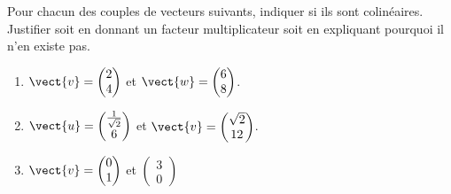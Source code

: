 
\begin{exercice}\label{exosmath-0299}

    Pour chacun des couples de vecteurs suivants, indiquer si ils sont colinéaires. Justifier soit en donnant un facteur multiplicateur soit en expliquant pourquoi il n'en existe pas.
    \begin{multicols}{2}
        \begin{enumerate}
            \item
                \( \vect{ v }=\begin{pmatrix}
                    2    \\ 
                    4    
                \end{pmatrix}\) et \( \vect{ w }=\begin{pmatrix}
                    6    \\ 
                    8    
                \end{pmatrix}\). 
            \item
                \( \vect{ u }=\begin{pmatrix}
                    \frac{1}{ \sqrt{2} }    \\ 
                    6    
                \end{pmatrix}\) et \( \vect{ v }=\begin{pmatrix}
                    \sqrt{2}    \\ 
                    12    
                \end{pmatrix}\).
            \item
                \( \vect{ v }=\begin{pmatrix}
                    0    \\ 
                    1    
                \end{pmatrix}\) et \( \begin{pmatrix}
                    3    \\ 
                    0    
                \end{pmatrix}\)
        \end{enumerate}
    \end{multicols}

\end{exercice}
